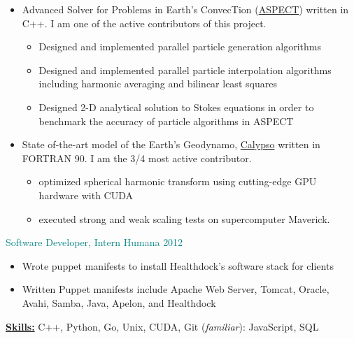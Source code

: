 \documentclass[11pt]{ltxdoc}
\begin{document}
      \begin{itemize}
      	
        \item Advanced Solver for Problems in Earth's ConvecTion (\href{https://github.com/geodynamics/aspect}{ASPECT}) written in C++. I am one of the active contributors of this project.
        
            \begin{itemize}        
            	\item Designed and implemented parallel particle generation algorithms
            	\item Designed and implemented parallel particle interpolation algorithms including harmonic averaging and bilinear least squares
            	\item Designed 2-D analytical solution to Stokes equations in order to benchmark the accuracy of particle algorithms in ASPECT
			\end{itemize}
      
		\item State of-the-art model of the Earth's Geodynamo,
		\href{https://geodynamics.org/cig/software/calypso/}{Calypso} written in FORTRAN 90. I am the 3/4 most active contributor.
  
         	\begin{itemize}
          		\item optimized spherical harmonic transform using cutting-edge GPU hardware with CUDA
          		\item executed strong and weak scaling tests on supercomputer Maverick.
          	\end{itemize}
            
	\end{itemize}
    
	\textcolor{teal}{Software Developer, Intern} \hfill \textcolor{teal}{Humana} \hfill \textcolor{teal}{2012}
		
		\begin{itemize}
			\item Wrote puppet manifests to install Healthdock's software stack for clients
			\item Written Puppet manifests include Apache Web Server, Tomcat, Oracle, Avahi, Samba, Java, Apelon, and Healthdock
		\end{itemize}
	
\textbf{\underline{Skills:}} C++, Python, Go, Unix, CUDA, Git (\emph{familiar}): JavaScript, SQL
\end{document}
